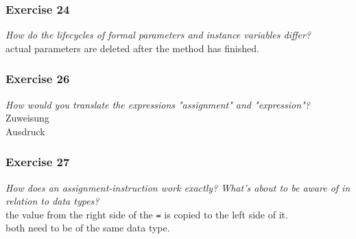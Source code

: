 \subsubsection*{Exercise 24}
\textit{How do the lifecycles of formal parameters and instance variables 
	differ?}\\
actual parameters are deleted after the method has finished. 

\subsubsection*{Exercise 26}
\textit{How would you translate the expressions "assignment" and 
	"expression"?}\\
Zuweisung \\
Ausdruck

\subsubsection*{Exercise 27}
\textit{How does an assignment-instruction work exactly? What's about to 
	be aware of in relation to data types?}\\
the value from the right side of the \verb?=? is copied to the left side of it. 
\\
both need to be of the same data type. 

